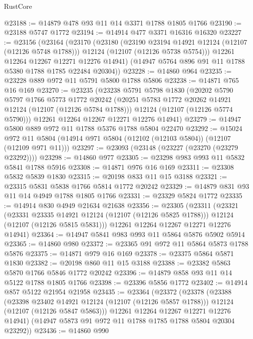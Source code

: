 \begin{lexlean}{RustCore}
\begin{coremodule}
@23188 := @14879 @478 @93 @11 @14 @3371 @1788 @1805 @1766
@23190 := @23188 @5747 @1772
@23194 := @14914 @477 @3371 @16316 @16320
@23227 := @23156
    (@23164
      (@23170
        (@23180
          (@23190 @23194 @14921 @12124 (@12107 (@12126 @5748 @1788)))
          @12124
          (@12107 (@12126 @5738 @5754)))
        @12261
        @12264
        @12267
        @12271
        @12276
        @14941)
      (@14947 @5764 @896 @91 @11 @1788 @5380 @1788 @1785 @22484 @20304))
@23228 := @14860 @964
@23235 := @23228 @889 @972 @11 @5791 @5800 @1788 @5806
@23238 := @14871 @765 @16 @169
@23270 := @23235
    (@23238
      @5791
      @5798
      @1830
      (@20202
        @5790
        @5797
        @1766
        @5773
        @1772
        @20242
        (@20251 @5783 @1772 @20262 @14921 @12124 (@12107 (@12126 @5784 @1788)))
        @12124
        (@12107 (@12126 @5774 @5790)))
      @12261
      @12264
      @12267
      @12271
      @12276
      @14941)
@23279 := @14947 @5800 @889 @972 @11 @1788 @5376 @1788 @5804 @22470
@23292 := @15024
    @972
    @11
    @5804
    (@14914 @971 @5804 (@12102 (@12103 @5804)) (@12107 (@12109 @971 @11)))
@23297 := @23093 (@23148 (@23227 (@23270 (@23279 @23292))))
@23298 := @14860 @977
@23305 := @23298 @983 @993 @11 @5832 @5841 @1788 @5916
@23308 := @14871 @976 @16 @169
@23311 := @23308 @5832 @5839 @1830
@23315 := @20198 @833 @11 @15 @3188
@23321 := @23315 @5831 @5838 @1766 @5814 @1772 @20242
@23329 := @14879 @831 @93 @11 @14 @4949 @1788 @1805 @1766
@23331 := @23329 @5824 @1772
@23335 := @14914 @830 @4949 @21634 @21638
@23356 := @23305
    (@23311
      (@23321
        (@23331 @23335 @14921 @12124 (@12107 (@12126 @5825 @1788)))
        @12124
        (@12107 (@12126 @5815 @5831)))
      @12261
      @12264
      @12267
      @12271
      @12276
      @14941)
@23364 := @14947 @5841 @983 @993 @11 @5864 @5876 @5902 @5914
@23365 := @14860 @980
@23372 := @23365 @91 @972 @11 @5864 @5873 @1788 @5876
@23375 := @14871 @979 @16 @169
@23378 := @23375 @5864 @5871 @1830
@23382 := @20198 @860 @11 @15 @3188
@23388 := @23382 @5863 @5870 @1766 @5846 @1772 @20242
@23396 := @14879 @858 @93 @11 @14 @5122 @1788 @1805 @1766
@23398 := @23396 @5856 @1772
@23402 := @14914 @857 @5122 @21954 @21958
@23435 := @23364
    (@23372
      (@23378
        (@23388
          (@23398 @23402 @14921 @12124 (@12107 (@12126 @5857 @1788)))
          @12124
          (@12107 (@12126 @5847 @5863)))
        @12261
        @12264
        @12267
        @12271
        @12276
        @14941)
      (@14947 @5873 @91 @972 @11 @1788 @1785 @1788 @5804 @20304 @23292))
@23436 := @14860 @990

\end{coremodule}
\end{lexlean}
